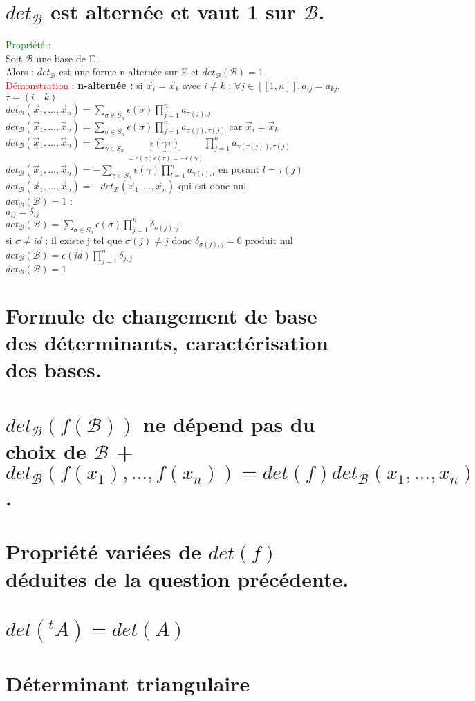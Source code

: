 \documentclass{article}
\begin{document}
	\section{$det_{\mathcal B}$ est alternée et vaut 1 sur $\mathcal B$.}
	\textcolor{green}{Propriété :} \\
	Soit $\mathcal B$ une base de E . \\
	Alors : $det_{\mathcal{B}}$ est une forme n-alternée sur E et $det_{\mathcal B}(\mathcal B)=1$ \\
	\textcolor{red}{Démonstration :}
	{\bf n-alternée :} si $\vec x_i= \vec x_k$ avec $i\neq k$ :
	$\forall j \in [[1,n]],a_{ij}=a_{kj}$, $\tau=( i \quad k)$ \\
	$det_{\mathcal B}(\vec x_1,..., \vec x_n) = \sum_{\sigma \in S_n} \epsilon(\sigma) \prod_{j=1}^n a_{\sigma(j),j}$ \\
	$det_{\mathcal B}(\vec x_1,..., \vec x_n) = \sum_{\sigma \in S_n} \epsilon(\sigma) \prod_{j=1}^n   a_{\sigma(j),\tau(j)}$ car $\vec x_i= \vec x_k$ \\
	$det_{\mathcal B}(\vec x_1,..., \vec x_n) = \sum_{\gamma \in S_n} \underbrace{\epsilon(\gamma \tau)}_{=\epsilon(\gamma)\epsilon(\tau)=-\epsilon(\gamma)} \prod_{j=1}^n a_{\gamma(\tau(j)),\tau(j)}$ \\
	$det_{\mathcal B}(\vec x_1,..., \vec x_n) = - \sum_{\gamma \in S_n} \epsilon(\gamma) \prod_{l=1}^n a_{\gamma(l),l}$ en posant $l=\tau(j)$ \\
	$det_{\mathcal B}(\vec x_1,..., \vec x_n) = -det_{\mathcal B}(\vec x_1,...,\vec x_n) $ qui est donc nul \\
	{\boldmath $det_{\mathcal B}(\mathcal B)=1$ :} \\
	$a_{ij}=\delta_{ij}$ \\
		$det_{\mathcal B}(\mathcal B)= \sum_{\sigma \in S_n} \epsilon(\sigma) \prod_{j=1}^n \delta_{\sigma(j),j}$ \\
	si $\sigma\neq id$ : il existe j tel que $\sigma(j)\neq j$ donc $\delta_{\sigma(j),j}=0$ produit nul \\
	$det_{\mathcal B}(\mathcal B)= \epsilon(id) \prod_{j=1}^n \delta_{j,j}$ \\
	$det_{\mathcal B}(\mathcal B)= 1$
	\section{Formule de changement de base des déterminants, caractérisation des bases.}
	\section{$det_{\mathcal B}(f(\mathcal B))$ ne dépend pas du choix de $\mathcal B$ + $det_{\mathcal B}(f(x_1),...,f(x_n))=det(f)det_{\mathcal B}(x_1,...,x_n) $.}
	\section{Propriété variées de $det(f)$ déduites de la question précédente.}
	\section{$det({}^tA)=det(A)$}
	\section{Déterminant triangulaire}
	
\end{document}

